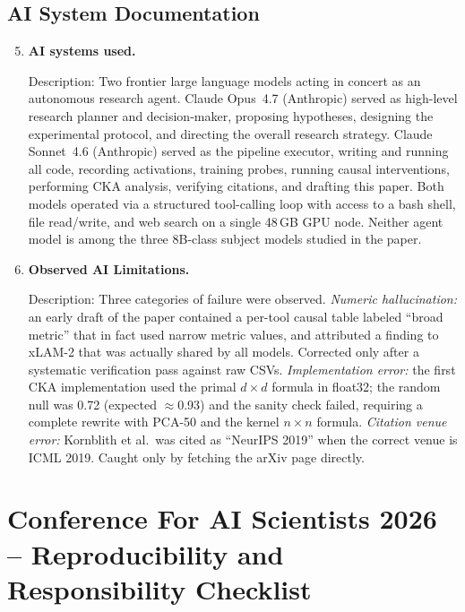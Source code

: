 \documentclass{article}
\begin{document}
\subsection*{AI System Documentation}

\begin{enumerate}
\setcounter{enumi}{4}

\item \textbf{AI systems used.}

Description: Two frontier large language models acting in concert
as an autonomous research agent.
Claude Opus~4.7 (Anthropic) served as high-level research planner and
decision-maker, proposing hypotheses, designing the experimental
protocol, and directing the overall research strategy.
Claude Sonnet~4.6 (Anthropic) served as the pipeline executor, writing
and running all code, recording activations, training probes, running
causal interventions, performing CKA analysis, verifying citations,
and drafting this paper.
Both models operated via a structured tool-calling loop with access
to a bash shell, file read/write, and web search on a single 48\,GB
GPU node.
Neither agent model is among the three 8B-class subject models studied
in the paper.

\item \textbf{Observed AI Limitations.}

Description: Three categories of failure were observed.
\emph{Numeric hallucination:} an early draft of the paper contained a
per-tool causal table labeled ``broad metric'' that in fact used narrow
metric values, and attributed a finding to xLAM-2 that was actually
shared by all models.  Corrected only after a systematic verification
pass against raw CSVs.
\emph{Implementation error:} the first CKA implementation used the
primal $d{\times}d$ formula in float32; the random null was 0.72
(expected $\approx$0.93) and the sanity check failed, requiring a
complete rewrite with PCA-50 and the kernel $n{\times}n$ formula.
\emph{Citation venue error:} Kornblith et al.\ was cited as
``NeurIPS 2019'' when the correct venue is ICML 2019.  Caught only
by fetching the arXiv page directly.

\end{enumerate}

\newpage
\section*{Conference For AI Scientists 2026 -- Reproducibility and Responsibility Checklist}
\label{checklist_reproducibility}
\end{document}
